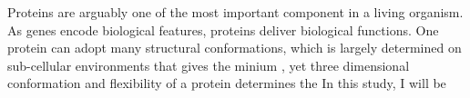 Proteins are arguably one of the most important component in a living organism. As genes encode biological features, proteins deliver biological functions. One protein can adopt many structural conformations, which is largely determined on sub-cellular environments that gives the minium , yet three dimensional conformation and flexibility of a protein determines the     In this study, I will be 